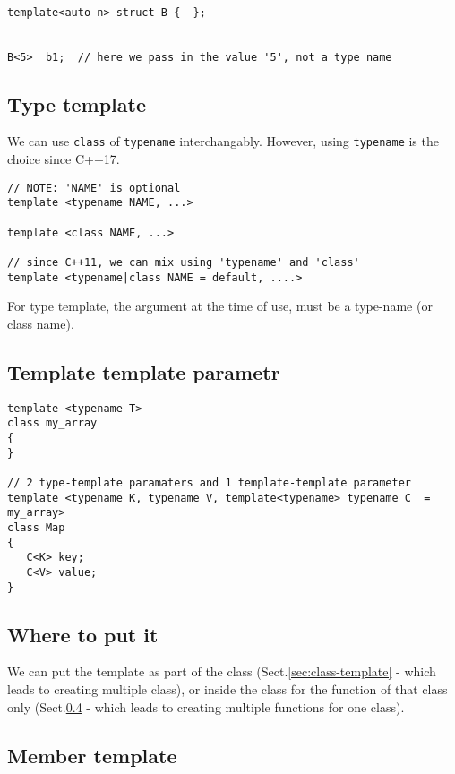 \begin{verbatim}

template<auto n> struct B {  };


B<5>  b1;  // here we pass in the value '5', not a type name
\end{verbatim}

\subsection{Type template}

We can use \verb!class! of \verb!typename! interchangably. However, using \verb!typename! is the choice since 
C++17.

\begin{verbatim}
// NOTE: 'NAME' is optional
template <typename NAME, ...>

template <class NAME, ...>

// since C++11, we can mix using 'typename' and 'class'
template <typename|class NAME = default, ....>

\end{verbatim}

For type template, the argument at the time of use, must be a type-name (or
class name).

\subsection{Template template parametr}
 
\begin{verbatim}
template <typename T>
class my_array
{
}

// 2 type-template paramaters and 1 template-template parameter
template <typename K, typename V, template<typename> typename C  = my_array>
class Map
{
   C<K> key;
   C<V> value;
}
\end{verbatim}


\subsection{Where to put it}

We can put the template as part of the class (Sect.\ref{sec:class-template} -
which leads to creating multiple class), or inside the class for the function of
that class only (Sect.\ref{sec:member-template} - which leads to creating
multiple functions for one class).

\subsection{Member template}
\label{sec:member-template}
\label{sec:template-member}


